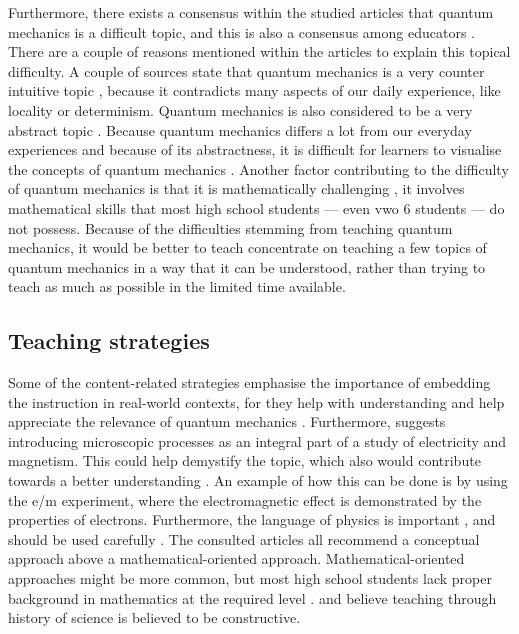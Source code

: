\documentclass[11pt,twoside]{report} %
\begin{document}
Furthermore, there exists a consensus within the studied articles that quantum mechanics is a difficult topic, and this is also a consensus among educators \cite{gianino,papaphotis1,papaphotis2}. There are a couple of reasons mentioned within the articles to explain this topical difficulty. A couple of sources state that quantum mechanics is a very counter intuitive topic \cite{henriksen, levrini, mckagan, singh2}, because it contradicts many aspects of our daily experience, like locality or determinism. Quantum mechanics is also considered to be a very abstract topic \cite{barnes, gianino, mckagan, papaphotis1, singh1}. Because quantum mechanics differs a lot from our everyday experiences and because of its abstractness, it is difficult for learners to visualise the concepts of quantum mechanics \cite{henriksen, mckagan}. Another factor contributing to the difficulty of quantum mechanics is that it is mathematically challenging \cite{gianino, mckagan}, it involves mathematical skills that most high school students --- even vwo 6 students --- do not possess. Because of the difficulties stemming from teaching quantum mechanics, it would be better to teach concentrate on teaching a few topics of quantum mechanics in a way that it can be understood, rather than trying to teach as much as possible in the limited time available.

\subsection{Teaching strategies}

Some of the content-related strategies emphasise the importance of embedding the instruction in real-world contexts, for they help with understanding \cite{mckagan,thacker,dori} and help appreciate the relevance of quantum mechanics \cite{barnes, henriksen, mckagan}. Furthermore,  suggests introducing microscopic processes as an integral part of a study of electricity and magnetism. This could help demystify the topic, which also would contribute towards a better understanding \cite{barnes, muller}. An example of how this can be done is by using the e/m experiment, where the electromagnetic effect is demonstrated by the properties of electrons. Furthermore, the language of physics is important \cite{henriksen}, and should be used carefully \cite{mckagan}. The consulted articles all recommend a conceptual approach above a mathematical-oriented approach. Mathematical-oriented approaches might be more common, but most high school students lack proper background in mathematics at the required level \cite{dori}.  and  believe teaching through history of science is believed to be constructive.
\end{document}
